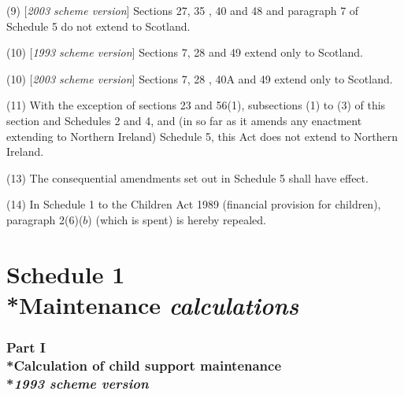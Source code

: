 \documentclass[12pt,a4paper]{article}
\begin{document}
(9) [\emph{2003 scheme version}] Sections 27, 35%
, 40  %
 and 48 and paragraph 7 of Schedule 5 do not extend to Scotland.

(10) [\emph{1993 scheme version}] Sections 7, 28 and 49 extend only to Scotland.

(10) [\emph{2003 scheme version}] Sections 7, 28%
, 40A  %
 and 49 extend only to Scotland.

(11) With the exception of sections 23 and 56(1), subsections (1)  to (3)  of this section and Schedules 2 and 4, and (in so far as it amends any enactment extending to Northern Ireland) Schedule 5, this Act does not extend to Northern Ireland.


(13) The consequential amendments set out in Schedule 5 shall have effect.

(14) In Schedule 1 to the Children Act 1989 (financial provision for children), paragraph 2(6)($b$)  (which is spent) is hereby repealed.


\bigskip

\small

\part[Schedule 1 --- Maintenance 
\emph{calculations}  %
]{Schedule 1\\*Maintenance 
\emph{calculations}  %
}

\section[Part I --- Calculation of child support maintenance --- \emph{1993 scheme version}]{Part I\\*Calculation of child support maintenance\\*\emph{1993 scheme version}}
\end{document}
